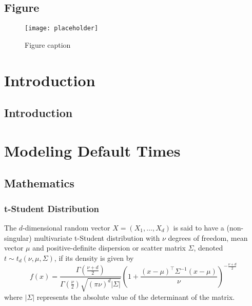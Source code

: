 \documentclass[11pt,fleqn]{book} %
\begin{document}

\section{Figure}

\begin{figure}[h]
\centering\texttt{[image: placeholder]}
\caption{Figure caption}
\end{figure}


\chapter{Introduction}
\section{Introduction}

\chapter{Modeling Default Times}

\section{Mathematics}

\subsection{t-Student Distribution}

\begin{definition}
The $d$-dimensional random vector $X=(X_1,\dots,X_d)$ is said to have a 
(non-singular) multivariate t-Student distribution with $\nu$ degrees of freedom, 
mean vector $\mu$ and positive-definite dispersion or scatter matrix $\Sigma$, 
denoted $t \sim t_d(\nu,\mu,\Sigma)$, if its density is given by
\begin{displaymath}
f(x)=\frac{\Gamma\left(\frac{\nu+d}{2}\right)}{\Gamma\left(\frac{\nu}{2}\right)\sqrt{(\pi \nu)^d |\Sigma|}}
\left(
1+ \frac{(x-\mu)^\top\Sigma^{-1}(x-\mu)}{\nu}
\right)^{-\frac{\nu+d}{2}}
\end{displaymath}
\noindent where $|\Sigma|$ represents the absolute value of the determinant of the matrix. 
\end{definition}
\end{document}
